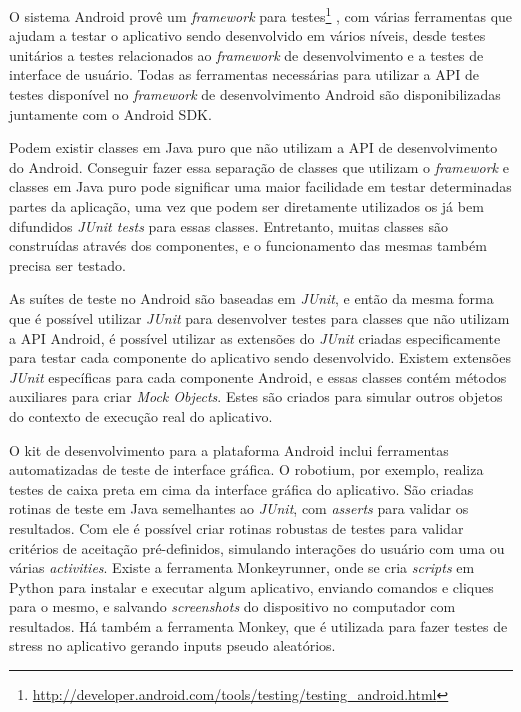 O sistema Android provê um \textit{framework} para testes\footnote{\url{http://developer.android.com/tools/testing/testing\_android.html}} , com várias ferramentas que ajudam a testar o aplicativo sendo desenvolvido em vários níveis, desde testes unitários a testes relacionados ao \textit{framework} de desenvolvimento e a testes de interface de usuário. Todas as ferramentas necessárias para utilizar a API de testes disponível no \textit{framework} de desenvolvimento Android são disponibilizadas juntamente com o Android SDK.

Podem existir classes em Java puro que não utilizam a API de desenvolvimento do Android. Conseguir fazer essa separação de classes que utilizam o \textit{framework} e classes em Java puro pode significar uma maior facilidade em testar determinadas partes da aplicação, uma vez que podem ser diretamente utilizados os já bem difundidos \textit{JUnit tests} para essas classes. Entretanto, muitas classes são construídas através dos componentes, e o funcionamento das mesmas também precisa ser testado.

As suítes de teste no Android são baseadas em \textit{JUnit}, e então da mesma forma que é possível utilizar \textit{JUnit} para desenvolver testes para classes que não utilizam a API Android, é possível utilizar as extensões do \textit{JUnit} criadas especificamente para testar cada componente do aplicativo sendo desenvolvido. Existem extensões \textit{JUnit} específicas para cada componente Android, e essas classes contém métodos auxiliares para criar \textit{Mock Objects}. Estes são criados para simular outros objetos do contexto de execução real do aplicativo.

O kit de desenvolvimento para a plataforma Android inclui ferramentas automatizadas de teste de interface gráfica. O robotium, por exemplo, realiza testes de caixa preta em cima da interface gráfica do aplicativo. São criadas rotinas de teste em Java semelhantes ao \textit{JUnit}, com \textit{asserts} para validar os resultados. Com ele é possível criar rotinas robustas de testes para validar critérios de aceitação pré-definidos, simulando interações do usuário com uma ou várias \textit{activities}. Existe a ferramenta Monkeyrunner, onde se cria \textit{scripts} em Python para instalar e executar algum aplicativo, enviando comandos e cliques para o mesmo, e salvando \textit{screenshots} do dispositivo no computador com resultados. Há também a ferramenta Monkey, que é utilizada para fazer testes de stress no aplicativo gerando inputs pseudo aleatórios.

